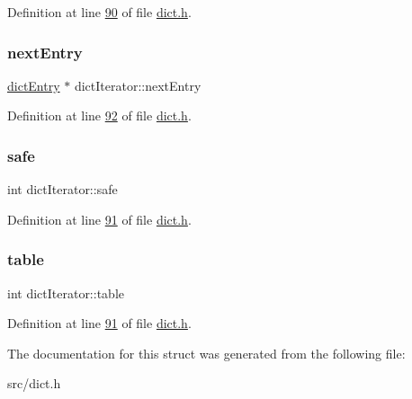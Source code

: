 Definition at line \hyperlink{dict_8h_source_l00090}{90} of file \hyperlink{dict_8h_source}{dict.\+h}.

\mbox{\label{structdictIterator_aa030de14f2996420066a50980581d0d8}} 
\subsubsection{\texorpdfstring{next\+Entry}{nextEntry}}
{\footnotesize\ttfamily \hyperlink{structdictEntry}{dict\+Entry} $\ast$ dict\+Iterator\+::next\+Entry}



Definition at line \hyperlink{dict_8h_source_l00092}{92} of file \hyperlink{dict_8h_source}{dict.\+h}.

\mbox{\label{structdictIterator_af8dd20e8e8bdab1e0331015005aba390}} 
\subsubsection{\texorpdfstring{safe}{safe}}
{\footnotesize\ttfamily int dict\+Iterator\+::safe}



Definition at line \hyperlink{dict_8h_source_l00091}{91} of file \hyperlink{dict_8h_source}{dict.\+h}.

\mbox{\label{structdictIterator_aea5d0c657d1dbea4bde6e7915c305598}} 
\subsubsection{\texorpdfstring{table}{table}}
{\footnotesize\ttfamily int dict\+Iterator\+::table}



Definition at line \hyperlink{dict_8h_source_l00091}{91} of file \hyperlink{dict_8h_source}{dict.\+h}.



The documentation for this struct was generated from the following file\+:\begin{DoxyCompactItemize}
\item 
src/dict.\+h\end{DoxyCompactItemize}
